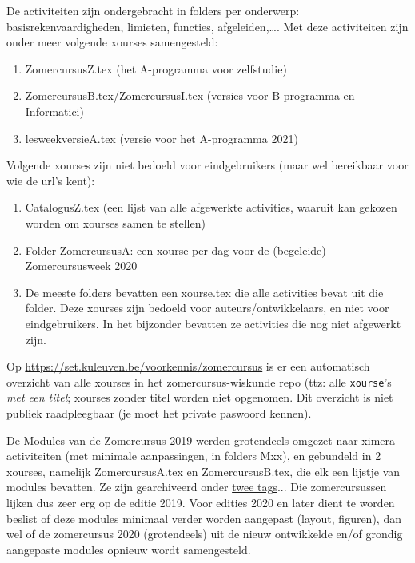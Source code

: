 \documentclass{ximera}
\begin{document}
De activiteiten zijn ondergebracht in folders per onderwerp: basisrekenvaardigheden, limieten, functies, afgeleiden,\ldots.  Met deze activiteiten zijn onder meer volgende xourses samengesteld:
\begin{enumerate}
	\item  ZomercursusZ.tex  (het A-programma voor zelfstudie)
   	\item  ZomercursusB.tex/ZomercursusI.tex  (versies voor B-programma en Informatici)
   	\item  lesweekversieA.tex (versie voor het A-programma 2021)
\end{enumerate}
Volgende xourses zijn niet bedoeld voor eindgebruikers (maar wel bereikbaar voor wie de url's kent):
\begin{enumerate}
   	\item  CatalogusZ.tex (een lijst van alle afgewerkte activities, waaruit kan gekozen worden om xourses samen te stellen)
	\item  Folder ZomercursusA: een xourse per dag voor de (begeleide) Zomercursusweek 2020
    \item  De meeste folders bevatten een xourse.tex die alle activities bevat uit die folder. Deze xourses zijn bedoeld voor auteurs/ontwikkelaars, en niet voor eindgebruikers. In het bijzonder bevatten ze activities die nog niet afgewerkt zijn.
\end{enumerate}


Op \url{https://set.kuleuven.be/voorkennis/zomercursus} is er een automatisch overzicht van alle xourses in het zomercursus-wiskunde repo (ttz: alle \verb|xourse|'s \textit{met een titel}; xourses zonder titel worden niet opgenomen. Dit overzicht is niet publiek raadpleegbaar (je moet het private paswoord kennen).

\begin{xmuitweiding}
	
De Modules van de Zomercursus 2019 werden grotendeels omgezet naar ximera-activiteiten (met  minimale aanpassingen, in folders Mxx), en gebundeld in 2 xourses, namelijk ZomercursusA.tex en ZomercursusB.tex, die elk een lijstje van modules bevatten. Ze zijn gearchiveerd onder \href{https://gitlab.kuleuven.be/monitoraat-wet/zomercursus-wiskunde/-/tags?search=archief}{twee tags}...  
Die zomercursussen lijken dus zeer erg op de editie 2019. Voor edities 2020 en later dient te worden beslist of deze modules minimaal verder worden aangepast (layout, figuren), dan wel of de zomercursus 2020 (grotendeels) uit de nieuw ontwikkelde en/of grondig aangepaste modules opnieuw wordt samengesteld.
\end{xmuitweiding}
\end{document}
